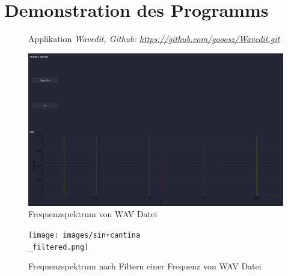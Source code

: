 \section{Demonstration des Programms}
\begin{frame}{\insertsection}
	\begin{figure}
		\caption*{Applikation \it{Wavedit}, Github: \href{https://github.com/gooosz/Wavedit.git}{https://github.com/gooosz/Wavedit.git}}
	\end{figure}
\end{frame}

\begin{frame}{\insertsection}
	\begin{figure}
		\includegraphics[width=\linewidth]{images/sin+cantina.png}
		\caption*{Frequenzspektrum von WAV Datei}
	\end{figure}
\end{frame}
\begin{frame}{\insertsection}
	\begin{figure}
		\texttt{[image: images/sin+cantina\\\_filtered.png]}
		\caption*{Frequenzspektrum nach Filtern einer Frequenz von WAV Datei}
	\end{figure}
\end{frame}